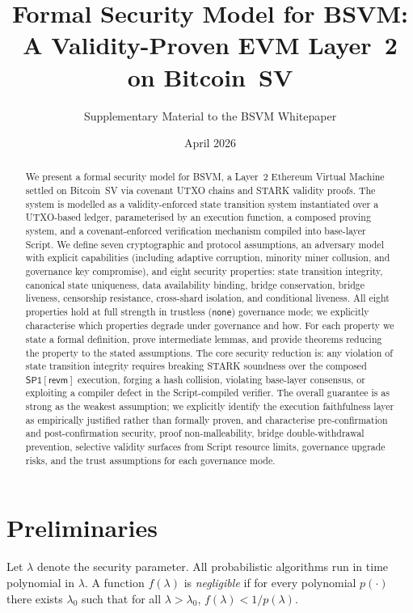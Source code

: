 \documentclass[11pt,a4paper]{article}
\title{Formal Security Model for BSVM:\\A Validity-Proven EVM Layer~2 on Bitcoin~SV}
\author{Supplementary Material to the BSVM Whitepaper}
\date{April 2026}
\newcommand{\SPone}{\mathsf{SP1}}
\newcommand{\revm}{\textsf{revm}}
\begin{document}
\maketitle

\begin{abstract}
\noindent We present a formal security model for BSVM, a Layer~2 Ethereum Virtual Machine settled on Bitcoin~SV via covenant UTXO chains and STARK validity proofs. The system is modelled as a validity-enforced state transition system instantiated over a UTXO-based ledger, parameterised by an execution function, a composed proving system, and a covenant-enforced verification mechanism compiled into base-layer Script. We define seven cryptographic and protocol assumptions, an adversary model with explicit capabilities (including adaptive corruption, minority miner collusion, and governance key compromise), and eight security properties: state transition integrity, canonical state uniqueness, data availability binding, bridge conservation, bridge liveness, censorship resistance, cross-shard isolation, and conditional liveness. All eight properties hold at full strength in trustless (\texttt{none}) governance mode; we explicitly characterise which properties degrade under governance and how. For each property we state a formal definition, prove intermediate lemmas, and provide theorems reducing the property to the stated assumptions. The core security reduction is: any violation of state transition integrity requires breaking STARK soundness over the composed $\SPone[\revm]$ execution, forging a hash collision, violating base-layer consensus, or exploiting a compiler defect in the Script-compiled verifier. The overall guarantee is as strong as the weakest assumption; we explicitly identify the execution faithfulness layer as empirically justified rather than formally proven, and characterise pre-confirmation and post-confirmation security, proof non-malleability, bridge double-withdrawal prevention, selective validity surfaces from Script resource limits, governance upgrade risks, and the trust assumptions for each governance mode.
\end{abstract}

\section{Preliminaries}\label{sec:prelim}

Let $\lambda$ denote the security parameter. All probabilistic algorithms run in time polynomial in $\lambda$. A function $f(\lambda)$ is \emph{negligible} if for every polynomial $p(\cdot)$ there exists $\lambda_0$ such that for all $\lambda > \lambda_0$, $f(\lambda) < 1/p(\lambda)$.
\end{document}
